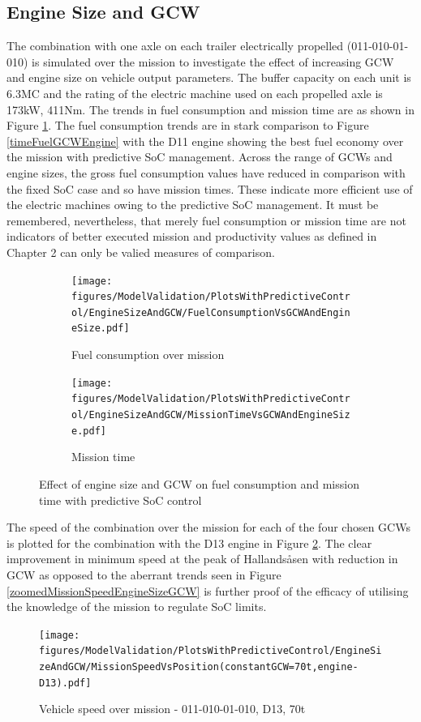 \documentclass[ExampleMasters.tex]{subfiles}
\begin{document}
\subsection{Engine Size and GCW}
The combination with one axle on each trailer electrically propelled (011-010-01-010) is simulated over the mission to investigate the effect of increasing GCW and engine size on vehicle output parameters. The buffer capacity on each unit is 6.3MC and the rating of the electric machine used on each propelled axle is 173kW, 411Nm. The trends in fuel consumption and mission time are as shown in Figure \ref{timeFuelGCWEnginePredictiveSoC}. The fuel consumption trends are in stark comparison to Figure \ref{timeFuelGCWEngine} with the D11 engine showing the best fuel economy over the mission with predictive SoC management. Across the range of GCWs and engine sizes, the gross fuel consumption values have reduced in comparison with the fixed SoC case and so have mission times. These indicate more efficient use of the electric machines owing to the predictive SoC management. It must be remembered, nevertheless, that merely fuel consumption or mission time are not indicators of better executed mission and productivity values as defined in Chapter 2 can only be valied measures of comparison.
\begin{figure}
\begin{subfigure}{.5\textwidth}
\centering
\texttt{[image: figures/ModelValidation/PlotsWithPredictiveControl/EngineSizeAndGCW/FuelConsumptionVsGCWAndEngineSize.pdf]}
\caption{Fuel consumption over mission}
\end{subfigure}
\begin{subfigure}{.5\textwidth}
\centering
\texttt{[image: figures/ModelValidation/PlotsWithPredictiveControl/EngineSizeAndGCW/MissionTimeVsGCWAndEngineSize.pdf]}
\caption{Mission time}
\end{subfigure}
\caption{Effect of engine size and GCW on fuel consumption and mission time with predictive SoC control}
\label{timeFuelGCWEnginePredictiveSoC}
\end{figure}
The speed of the combination over the mission for each of the four chosen GCWs is plotted for the combination with the D13 engine in Figure \ref{speedEngineDownsizingPredictiveSoC}. The clear improvement in minimum speed at the peak of Hallands\aa sen with reduction in GCW as opposed to the aberrant trends seen in Figure \ref{zoomedMissionSpeedEngineSizeGCW} is further proof of the efficacy of utilising the knowledge of the mission to regulate SoC limits.
\begin{figure}
\centering
\texttt{[image: figures/ModelValidation/PlotsWithPredictiveControl/EngineSizeAndGCW/MissionSpeedVsPosition(constantGCW=70t,engine-D13).pdf]}
\caption{Vehicle speed over mission - 011-010-01-010, D13, 70t}
\label{speedEngineDownsizingPredictiveSoC}
\end{figure}
\end{document}
